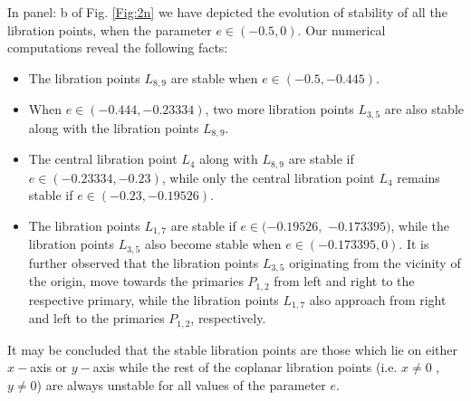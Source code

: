 \documentclass[preprint,fleqn,5p,numbers,sort&compress]{elsarticle}
\begin{document}
%
In panel: b of Fig. \ref{Fig:2n} we have depicted the evolution of stability of all the libration points, when the parameter $e \in (-0.5, 0)$. Our numerical computations reveal the following facts:
\begin{itemize}
  \item The libration points $L_{8,9}$ are stable when $e\in(-0.5, -0.445)$.
  \item When $e\in(-0.444, -0.23334)$, two more libration points $L_{3,5}$ are also stable along with the libration points $L_{8,9}$.
  \item The central libration point $L_4$ along with $L_{8,9}$ are stable if $e\in(-0.23334, -0.23)$, while only the central libration point $L_4$ remains stable if $e\in(-0.23, -0.19526)$.
  \item The libration points $L_{1,7}$ are stable if $e\in(-0.19526,$ $ -0.173395)$, while the libration points $L_{3,5}$ also become stable when $e\in(-0.173395, 0)$. It is further observed that the libration points $L_{3,5}$  originating from the vicinity of the origin, move towards the primaries $P_{1,2}$ from left and right to the respective primary, while the libration points $L_{1,7}$ also approach from right and left to the primaries $P_{1,2}$, respectively.
\end{itemize}
It may be concluded that the stable libration points are those which lie on either $x-$axis or $y-$axis while the rest of the coplanar libration points (i.e. $x\neq0$ , $y\neq0$) are always unstable for all values of the parameter $e$.

\end{document}
